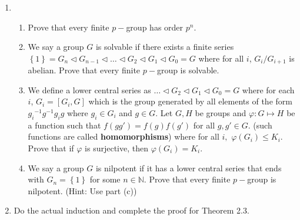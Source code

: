 \documentclass[letterpaper,12pt]{article}
\newcommand{\set}[1]{\left\{ #1 \right\}}
\begin{document}
\begin{enumerate}
\begin{enumerate}
\end{enumerate}
\item \begin{enumerate}
    \item Prove that every finite $p-$group has order $p^n$.
    \item We say a group $G$ is solvable if there exists a finite series $\set{1} = G_n \triangleleft G_{n-1} \triangleleft \ldots \triangleleft G_2 \triangleleft G_1 \triangleleft G_0 = G$ where for all $i$, $G_i/G_{i+1}$ is abelian. Prove that every finite $p-$group is solvable.
    \item We define a lower central series as $\ldots \triangleleft G_2 \triangleleft G_1 \triangleleft G_0 = G$ where for each $i$, $G_i = [G_i,G]$ which is the group generated by all elements of the form ${g_i}^{-1}g^{-1}g_ig$ where $g_i \in G_i$ and $g \in G$. Let $G,H$ be groups and $\varphi: G \mapsto H$ be a function such that $f(gg')=f(g)f(g')$ for all $g,g' \in G$. (such functions are called \textbf{homomorphisms}) where for all $i,$ $\varphi(G_i)\leq K_i$. Prove that if $\varphi$ is surjective, then $\varphi(G_i)=K_i$.
    \item We say a group $G$ is nilpotent if it has a lower central series that ends with $G_n = \set{1}$ for some $n \in \mathbb{N}$. Prove that every finite $p-$group is nilpotent. (Hint: Use part (c))
\end{enumerate}
\item Do the actual induction and complete the proof for Theorem 2.3.
\end{enumerate}
\end{document}
